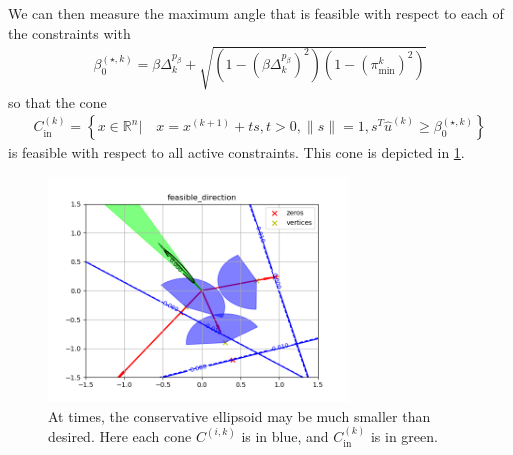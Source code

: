\documentclass{article}
\theoremstyle{case}
\numberwithin{theorem}{subsection}
\newcommand{\bsk}{{\beta_0^{(\star, k)}}}
\newcommand{\dk}{\Delta_k}
\newcommand{\fcki}{{C^{(k)}_{\textrm{in}}}}
\newcommand{\huk}{{{\hat u}^{(k)}}}
\newcommand{\Rn}{\mathbb R^n}
\newcommand{\thetamink}{{\pi^k_{\textrm{min}}}}
\newcommand{\xkpo}{{{x}^{(k+1)}}}
\newcommand{\fik}{{C^{(i, k)}}}
\begin{document}
We can then measure the maximum angle that is feasible with respect to each of the constraints with
\begin{align}
\bsk = \beta\dk^{p_{\beta}} + \sqrt{\left(1 - \left(\beta\dk^{p_{\beta}}\right)^2\right)\left(1 - \left(\thetamink\right) ^2\right)} \label{define_bsk}
\end{align}
so that the cone
\begin{align}
\fcki = \left\{x \in \Rn \bigg| \quad x = \xkpo + ts, t > 0, \|s\| = 1, s^T\huk \ge \bsk \right\} \label{define_inner_cone}
\end{align}
is feasible with respect to all active constraints.
This cone is depicted in \cref{feasible_direction}.
\begin{figure}[ht]
    \centering
    \includegraphics[width=300px]{images/feasible_direction.png}
    \caption{
    	At times, the conservative ellipsoid may be much smaller than desired.
    	Here each cone $\fik$ is in blue, and $\fcki$ is in green.
	}
    \label{feasible_direction}
\end{figure}
\end{document}
